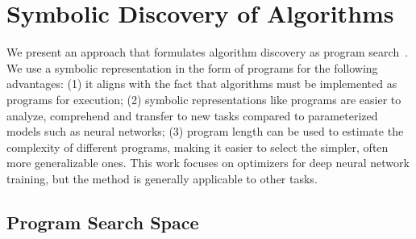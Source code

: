 \documentclass{article}
\begin{document}
\section{Symbolic Discovery of Algorithms}

We present an approach that formulates algorithm discovery as program search~\citep{koza1994genetic, brameier2007linear, real2020automl}. We use a symbolic representation in the form of programs for the following advantages: (1) it aligns with the fact that algorithms must be implemented as programs for execution; (2) symbolic representations like programs are easier to analyze, comprehend and transfer to new tasks compared to parameterized models such as neural networks; (3) program length can be used to estimate the complexity of different programs, making it easier to select the simpler, often more generalizable ones. This work focuses on optimizers for deep neural network training, but the method is generally applicable to other tasks.



\subsection{Program Search Space}

\end{document}
